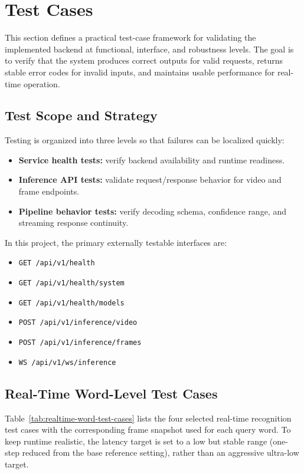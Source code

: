 \section{Test Cases}
This section defines a practical test-case framework for validating the implemented backend at functional, interface, and robustness levels. The goal is to verify that the system produces correct outputs for valid requests, returns stable error codes for invalid inputs, and maintains usable performance for real-time operation.

\subsection{Test Scope and Strategy}
Testing is organized into three levels so that failures can be localized quickly:
\begin{itemize}[leftmargin=1.5em]
\item \textbf{Service health tests:} verify backend availability and runtime readiness.
\item \textbf{Inference API tests:} validate request/response behavior for video and frame endpoints.
\item \textbf{Pipeline behavior tests:} verify decoding schema, confidence range, and streaming response continuity.
\end{itemize}

In this project, the primary externally testable interfaces are:
\begin{itemize}[leftmargin=1.5em]
\item \texttt{GET /api/v1/health}
\item \texttt{GET /api/v1/health/system}
\item \texttt{GET /api/v1/health/models}
\item \texttt{POST /api/v1/inference/video}
\item \texttt{POST /api/v1/inference/frames}
\item \texttt{WS /api/v1/ws/inference}
\end{itemize}

\subsection{Real-Time Word-Level Test Cases}
Table~\ref{tab:realtime-word-test-cases} lists the four selected real-time recognition test cases with the corresponding frame snapshot used for each query word. To keep runtime realistic, the latency target is set to a low but stable range (one-step reduced from the base reference setting), rather than an aggressive ultra-low target.

